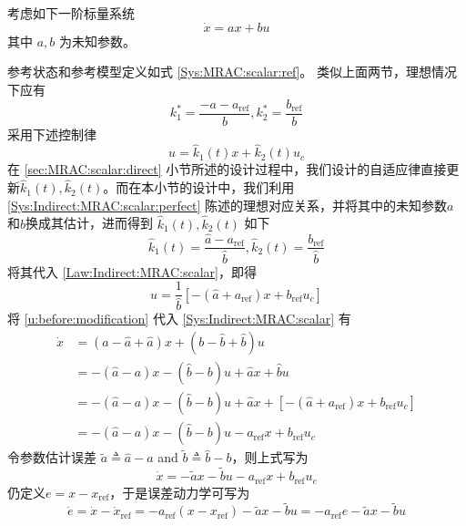 考虑如下一阶标量系统
\begin{equation}
  \dot{x} = a x + b  u \label{Sys:Indirect:MRAC:scalar}
\end{equation}
其中 $a, b$ 为未知参数。

参考状态和参考模型定义如式 \eqref{Sys:MRAC:scalar:ref}。
类似上面两节，理想情况下应有
\begin{equation}
  k^{\ast}_1 = \frac{-a - a_{\ensuremath{\operatorname{ref}}}}{b}, k^{\ast}_2 =
  \frac{b_{\ensuremath{\operatorname{ref}}}}{b}
  \label{Sys:Indirect:MRAC:scalar:perfect}
\end{equation}
采用下述控制律
\begin{equation}
  u = \hat{k}_1 (t) x + \hat{k}_2 (t) u_c\label{Law:Indirect:MRAC:scalar}
\end{equation}
在 \ref{sec:MRAC:scalar:direct} 小节所述的设计过程中，我们设计的自适应律直接更新$\hat{k}_1 (t), \hat{k}_2 (t)$。而在本小节的设计中，我们利用
\eqref{Sys:Indirect:MRAC:scalar:perfect} 陈述的理想对应关系，并将其中的未知参数$a$和$b$换成其估计，进而得到 $\hat{k}_1 (t), \hat{k}_2 (t)$ 如下
\[ \hat{k}_1 (t) = \frac{\hat{a} -
   a_{\ensuremath{\operatorname{ref}}}}{\hat{b}}, \hat{k}_2 (t) =
   \frac{b_{\ensuremath{\operatorname{ref}}}}{\hat{b}} \]
将其代入 \eqref{Law:Indirect:MRAC:scalar}，即得
\begin{equation}
  u = \frac{1}{\hat{b}} [-(\hat{a} + a_{\ensuremath{\operatorname{ref}}}) x +
  b_{\ensuremath{\operatorname{ref}}} u_c] \label{u:before:modification}
\end{equation}
将 \eqref{u:before:modification} 代入 \eqref{Sys:Indirect:MRAC:scalar} 有
\begin{align}
  \dot{x} & = (a - \hat{a} + \hat{a})  x + (b - \hat{b} + \hat{b} ) u
  \nonumber\\
  & = -(\hat{a} - a)  x -(\hat{b} -b)  u + \hat{a} x + \hat{b} u \nonumber\\
  & = -(\hat{a} - a)  x -(\hat{b} -b)  u + \hat{a} x + [-(\hat{a} + a_{\ensuremath{\operatorname{ref}}}) x +
  b_{\ensuremath{\operatorname{ref}}} u_c]\nonumber \\
  & = -(\hat{a} - a)  x -(\hat{b} -b)  u -a_{\ensuremath{\operatorname{ref}}} x +
  b_{\ensuremath{\operatorname{ref}}} u_c \nonumber
\end{align}
令参数估计误差 $\tilde{a}  \triangleq \hat{a} - a$ and $\tilde{b}  \triangleq \hat{b} -b$，则上式写为
\begin{equation*}
   \dot{x}  = -\tilde{a}  x - \tilde{b}  u - a_{\ensuremath{\operatorname{ref}}} x +
  b_{\ensuremath{\operatorname{ref}}} u_c
\end{equation*}
仍定义$e=x-x_{\operatorname{ref}}$，于是误差动力学可写为
\begin{equation}
  \dot{e} =\dot{x}-\dot{x}_{\operatorname{ref}}= - a_{\ensuremath{\operatorname{ref}}} (x-x_{\operatorname{ref}})- \tilde{a}  x - \tilde{b}u= -a_{\ensuremath{\operatorname{ref}}} e - \tilde{a}  x - \tilde{b}u\label{error_dyn_indirect}
\end{equation}

